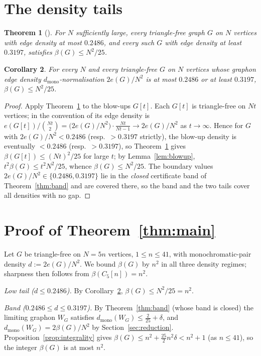 \documentclass[11pt]{article}
\newtheorem{theorem}{Theorem}[section]
\newtheorem{corollary}[theorem]{Corollary}
\theoremstyle{remark}
\newcommand{\bip}{\beta}
\newcommand{\dmono}{d_{\mathrm{mono}}}
\begin{document}
\section{The density tails}\label{sec:tails}

\begin{theorem}[{\cite[Theorem 1.3]{BCL21}}]\label{thm:bcl}
For $N$ sufficiently large, every triangle-free graph $G$ on $N$ vertices with
edge density at most $0.2486$, and every such $G$ with edge density at least
$0.3197$, satisfies $\bip(G)\le N^2/25$.
\end{theorem}

\begin{corollary}\label{cor:tails}
For \emph{every} $N$ and every triangle-free $G$ on $N$ vertices whose
\emph{graphon} edge density $\dmono$-normalisation $2e(G)/N^2$ is at most $0.2486$
or at least $0.3197$, $\bip(G)\le N^2/25$.
\end{corollary}

\begin{proof}
Apply Theorem~\ref{thm:bcl} to the blow-ups $G[t]$. Each $G[t]$ is triangle-free on
$Nt$ vertices; in the convention of \cite{BCL21} its edge density is
$e(G[t])/\binom{Nt}{2}=\bigl(2e(G)/N^2\bigr)\cdot\tfrac{Nt}{Nt-1}\to 2e(G)/N^2$ as
$t\to\infty$. Hence for $G$ with $2e(G)/N^2<0.2486$ (resp.\ $>0.3197$ strictly), the
blow-up density is eventually $<0.2486$ (resp.\ $>0.3197$), so Theorem~\ref{thm:bcl}
gives $\bip(G[t])\le (Nt)^2/25$ for large $t$; by Lemma~\ref{lem:blowup},
$t^2\bip(G)\le t^2N^2/25$, whence $\bip(G)\le N^2/25$. The boundary values
$2e(G)/N^2\in\{0.2486,0.3197\}$ lie in the \emph{closed} certificate band of
Theorem~\ref{thm:band} and are covered there, so the band and the two tails cover
all densities with no gap.
\end{proof}

\section{Proof of Theorem~\ref{thm:main}}\label{sec:closure}

Let $G$ be triangle-free on $N=5n$ vertices, $1\le n\le 41$, with monochromatic-pair
density $d:=2e(G)/N^2$. We bound $\bip(G)$ by $n^2$ in all three density regimes;
sharpness then follows from $\bip(C_5[n])=n^2$.

\smallskip\noindent\emph{Low tail ($d\le 0.2486$).} By Corollary~\ref{cor:tails},
$\bip(G)\le N^2/25=n^2$.

\smallskip\noindent\emph{Band ($0.2486\le d\le 0.3197$).} By
Theorem~\ref{thm:band} (whose band is closed) the limiting graphon $W_G$ satisfies
$\dmono(W_G)\le\tfrac2{25}+\delta$, and $\dmono(W_G)=2\bip(G)/N^2$ by
Section~\ref{sec:reduction}. Proposition~\ref{prop:integrality} gives
$\bip(G)\le n^2+\tfrac{25}{2}n^2\delta<n^2+1$ (as $n\le 41$), so the integer
$\bip(G)$ is at most $n^2$.
\end{document}
